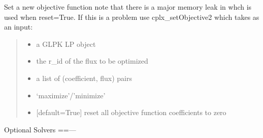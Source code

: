 \documentclass[letterpaper,12pt,english]{sphinxmanual}
\begin{document}
\begin{fulllineitems}
\label{\detokenize{api/solvers:cbmpy.CBGLPK.glpk_setObjective}}
\pysigstartsignatures
\pysiglinewithargsret
{}
{\sphinxparamcomma {}\sphinxparamcomma {}\sphinxparamcomma {}\sphinxparamcomma {}}
{}
\pysigstopsignatures
\sphinxAtStartPar
Set a new objective function note that there is a major memory leak in  whch is used when reset=True. If this is a problem use cplx\_setObjective2 which takes  as an input:
\begin{quote}\begin{description}
\begin{itemize}
\item {} 
\sphinxAtStartPar
{} \textendash{} a GLPK LP object

\item {} 
\sphinxAtStartPar
{} \textendash{} the r\_id of the flux to be optimized

\item {} 
\sphinxAtStartPar
{} \textendash{} a list of (coefficient, flux) pairs

\item {} 
\sphinxAtStartPar
{} \textendash{} ‘maximize’/’minimize’

\item {} 
\sphinxAtStartPar
{} \textendash{} {[}default=True{]} reset all objective function coefficients to zero

\end{itemize}

\end{description}\end{quote}

\end{fulllineitems}


\sphinxAtStartPar
Optional Solvers
==—\sphinxhyphen{}
\end{document}
